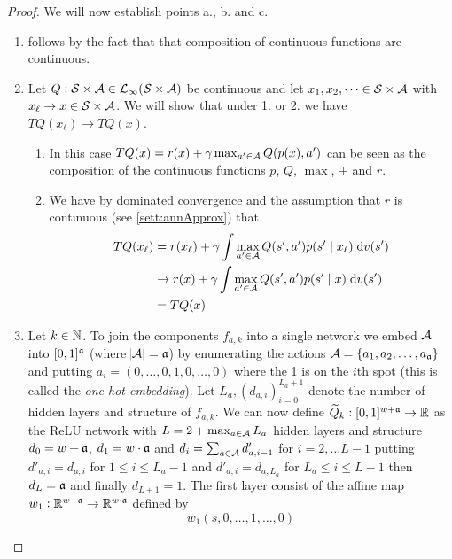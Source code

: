 \begin{proof}[Proof]
  We will now establish points a., b. and c.
  \begin{enumerate}[label = \alph*.]
  \item follows by the fact that that composition of continuous functions
    are continuous.
  \item Let $Q: \mathcal{S} \times \mathcal{A} \in \mathcal{L}_\infty(\mathcal{S} \times \mathcal{A})$
    be continuous and let
    $x_1, x_2, \dots \in \mathcal{S} \times \mathcal{A}$ with
    $x_\ell \to x \in \mathcal{S} \times \mathcal{A}$.
    We will show that
    under 1. or 2. we have $TQ(x_\ell) \to TQ(x)$.
    \begin{enumerate}[label = \arabic*.]
      \item In this case $TQ(x) = r(x) + \gamma
	\max_{a' \in \mathcal{A}} Q(p(x), a')$ can be seen as the composition
	of the continuous functions $p$, $Q$, $\max$, $+$ and $r$.
      \item We have by dominated convergence and the assumption that
	$r$ is continuous (see \cref{sett:annApprox}) that
	\begin{align*}
	  TQ(x_\ell) &= r(x_\ell) + \gamma \int \max_{a'\in \mathcal{A}}
	  Q(s', a') p(s' \mid x_\ell) \; \mathrm{d} v(s')
	  \\ &\to r(x) + \gamma \int \max_{a'\in \mathcal{A}}
	  Q(s', a') p(s' \mid x) \; \mathrm{d} v(s')
	  \\ &= TQ(x)
	\end{align*}
    \end{enumerate}
  \item Let $k \in \mathbb{N}$.
    To join the components $f_{a, k}$ into a single network
    we embed $\mathcal{A}$ into $[0,1]^\frak{a}$ (where $\abs{\mathcal{A}} = \frak{a}$)
    by enumerating the actions $\mathcal{A} = \{ a_1, a_2, \dots, a_\frak{a} \}$
    and putting $a_i = (0,\dots,0,1,0,\dots,0)$ where the 1 is on the $i$th
    spot (this is called the \emph{one-hot embedding}).
    Let $L_a, (d_{a, i})_{i=0}^{L_a + 1}$ denote the number of hidden layers 
    and structure of $f_{a, k}$.
    We can now define $\widetilde{Q}_k : [0,1]^{w + \frak{a}} \to \mathbb{R}$
    as the ReLU network with 
    $L = 2 + \max_{a \in \mathcal{A}} L_a$ hidden layers and structure
    $d_0 = w + \frak{a}$, $d_1 = w \cdot \frak{a}$ and
    $d_i = \sum_{a \in \mathcal{A}} d'_{a, i-1}$ for $i = 2, \dots L-1$ putting
    $d'_{a, i} = d_{a, i}$ for $1 \leq i \leq L_a - 1$
    and $d'_{a, i} = d_{a, L_a}$ for $L_a \leq i \leq L - 1$
    then $d_L = \frak{a}$
    and finally $d_{L + 1} = 1$.
    The first layer consist of the affine map
    $w_1 : \mathbb{R}^{w + \frak{a}} \to \mathbb{R}^{w \cdot \frak{a}}$ defined by
    \[ w_1(s, 0, \dots, 1, \dots, 0)
\]
\end{enumerate}
\end{proof}

